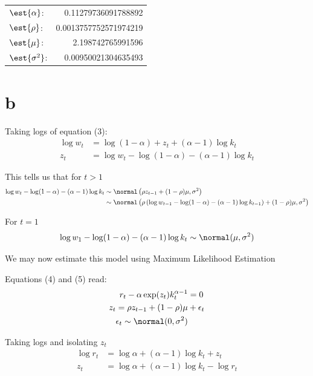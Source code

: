 \documentclass[12pt, letterpaper]{paper}
\begin{document}
\begin{center}
\begin{tabular}{lr}
\(\est{\alpha}\): & 0.11279736091788892\\
\(\est{\rho}\): & 0.0013757752571974219\\
\(\est{\mu}\): & 2.198742765991596\\
\(\est{\sigma^{2}}\): & 0.00950021304635493\\
\end{tabular}
\end{center}

\section{b}
\label{sec:orgc0d4865}

Taking logs of equation (3):
\begin{align*}
  \log w_t &= \log ( 1- \alpha) + z_t + (\alpha-1) \log k_t\\
  z_t &= \log w_t - \log ( 1- \alpha) - (\alpha-1) \log k_t
\end{align*}

This tells us that for $t > 1$
\begin{align*}
  \log w_t - \log ( 1- \alpha) - (\alpha-1) \log k_t &\sim \normal\left( \rho z_{t-1} +
                                             (1-\rho)\mu, \sigma^2 \right)\\
  &\sim \normal\left( \rho\left( \log w_{t-1} - \log( 1- \alpha) -(\alpha-1) \log
    k_{t-1} \right) + (1-\rho)\mu, \sigma^2 \right)
\end{align*}

For $t=1$
\begin{equation*}
  \log w_1 - \log ( 1- \alpha) - (\alpha-1) \log k_t \sim \normal( \mu, \sigma^2)
\end{equation*}


We may now estimate this model using Maximum Likelihood Estimation

Equations (4) and (5) read:
\begin{align*}
  r_t - \alpha \exp( z_t ) k_t^{\alpha -1 } &= 0\\
  z_t = \rho z_{t-1} + (1-\rho)\mu &+ \epsilon_t\\
  \epsilon_t \sim \normal( 0, \sigma^2)
\end{align*}

Taking logs and isolating $z_t$
\begin{align*}
  \log r_t  &= \log \alpha + (\alpha-1) \log k_t + z_t\\
  z_t &= \log \alpha + (\alpha-1) \log k_t - \log r_t
\end{align*}
\end{document}
